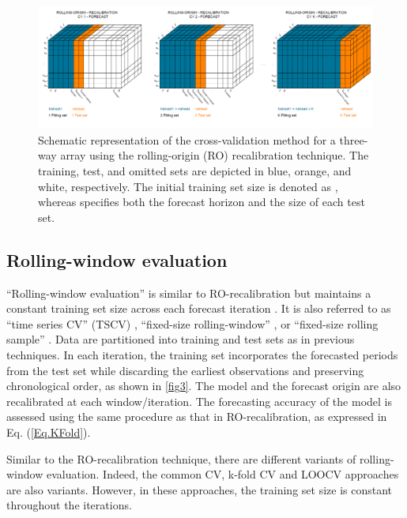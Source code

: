\begin{figure}[h!]
\centering
\includegraphics*[width=\textwidth]{RO_RECALIBRATION.png}
\caption{Schematic representation of the cross-validation method for a three-way array using the rolling-origin (RO) recalibration technique. The training, test, and omitted sets are depicted in blue, orange, and white, respectively. The initial training set size is denoted as , whereas  specifies both the forecast horizon and the size of each test set. }
\label{fig2}
\end{figure}

\subsection{Rolling-window evaluation}

``Rolling-window evaluation'' is similar to RO-recalibration but maintains a constant training set size across each forecast iteration \citep{Armstrong1972, Tashman2000}. It is also referred to as ``time series CV'' (TSCV) \citep{Hart1994, Berg2012}, ``fixed-size rolling-window'' \citep{Swanson1997}, or ``fixed-size rolling sample'' \citep{Callen1996}. Data are partitioned into training and test sets as in previous techniques. In each iteration, the training set incorporates the forecasted periods from the test set while discarding the earliest observations and preserving chronological order, as shown in \autoref{fig3}. The model and the forecast origin are also recalibrated at each window/iteration. The forecasting accuracy of the model is assessed using the same procedure as that in RO-recalibration, as expressed in Eq. (\ref{Eq.KFold}).

Similar to the RO-recalibration technique, there are different variants of rolling-window evaluation. Indeed, the common CV, k-fold CV and LOOCV approaches are also variants. However, in these approaches, the training set size is constant throughout the iterations.

